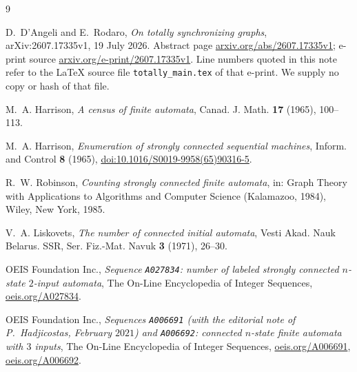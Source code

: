 \documentclass[11pt]{amsart}
\theoremstyle{remark}
\begin{document}
\begin{thebibliography}{9}

D.~D'Angeli and E.~Rodaro,
\emph{On totally synchronizing graphs},
arXiv:2607.17335v1, 19 July 2026.
Abstract page \href{https://arxiv.org/abs/2607.17335v1}{arxiv.org/abs/2607.17335v1};
e-print source \href{https://arxiv.org/e-print/2607.17335v1}{arxiv.org/e-print/2607.17335v1}.
Line numbers quoted in this note refer to the \LaTeX{} source file
\texttt{totally\_main.tex} of that e-print.  We supply no copy or hash of that file.

M.~A. Harrison,
\emph{A census of finite automata},
Canad. J. Math. \textbf{17} (1965), 100--113.

M.~A. Harrison,
\emph{Enumeration of strongly connected sequential machines},
Inform. and Control \textbf{8} (1965),
\href{https://doi.org/10.1016/S0019-9958(65)90316-5}{doi:10.1016/S0019-9958(65)90316-5}.

R.~W. Robinson,
\emph{Counting strongly connected finite automata},
in: Graph Theory with Applications to Algorithms and Computer Science
(Kalamazoo, 1984), Wiley, New York, 1985.

V.~A. Liskovets,
\emph{The number of connected initial automata},
Vesti Akad. Nauk Belarus. SSR, Ser. Fiz.-Mat. Navuk \textbf{3} (1971), 26--30.

OEIS Foundation Inc.,
\emph{Sequence \texttt{A027834}: number of labeled strongly connected $n$-state $2$-input
automata},
The On-Line Encyclopedia of Integer Sequences,
\href{https://oeis.org/A027834}{oeis.org/A027834}.

OEIS Foundation Inc.,
\emph{Sequences \texttt{A006691} (with the editorial note of P.~Hadjicostas, February
$2021$) and \texttt{A006692}: connected $n$-state finite automata with $3$ inputs},
The On-Line Encyclopedia of Integer Sequences,
\href{https://oeis.org/A006691}{oeis.org/A006691},
\href{https://oeis.org/A006692}{oeis.org/A006692}.

\end{thebibliography}
\end{document}
